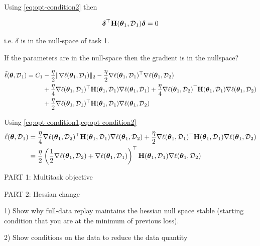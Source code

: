 \documentclass{article} %
\newcommand{\hessian}{\vH}
\begin{document}
Using \cref{eq:opt-condition2} then 

\begin{align}
    \vdelta^\top\hessian(\vparam_1, \data_{1})\vdelta = 0
\end{align}

i.e. $\delta$ is in the null-space of task 1. 

If the parameters are in the null-space then the gradient is in the nullspace?


\begin{align}
        \tilde{\loss}(\vparam, \data_{1}) 
        =  
        C_1 
        & -\frac{\eta}{2}\|\nabla\loss(\vparam_1,\data_1)\|_2 -\frac{\eta}{2}\nabla\loss(\vparam_1,\data_1)^\top\nabla\loss(\vparam_1,\data_2) \\
        &+ \frac{\eta}{4}\nabla\loss(\vparam_1,\data_1)^\top\hessian(\vparam_1, \data_{1})\nabla\loss(\vparam_1,\data_1) + \frac{\eta}{4}\nabla\loss(\vparam_1,\data_2)^\top\hessian(\vparam_1, \data_{1})\nabla\loss(\vparam_1,\data_2) \\
        &+ \frac{\eta}{2}\nabla\loss(\vparam_1,\data_1)^\top\hessian(\vparam_1, \data_{1})\nabla\loss(\vparam_1,\data_2)
\end{align}

Using \cref{eq:opt-condition1,eq:opt-condition2}
\begin{align}
        \tilde{\loss}(\vparam, \data_{1}) 
        & = \frac{\eta}{4}\nabla\loss(\vparam_1,\data_2)^\top\hessian(\vparam_1, \data_{1})\nabla\loss(\vparam_1,\data_2) + \frac{\eta}{2}\nabla\loss(\vparam_1,\data_1)^\top\hessian(\vparam_1, \data_{1})\nabla\loss(\vparam_1,\data_2) \\
        & = \frac{\eta}{2}\rnd{\frac{1}{2}\nabla\loss(\vparam_1,\data_2) + \nabla\loss(\vparam_1,\data_1)}^\top\hessian(\vparam_1, \data_{1})\nabla\loss(\vparam_1,\data_2)
\end{align}

PART 1: Multitask objective 



PART 2: Hessian change 



1) Show why full-data replay maintains the hessian null space stable (starting condition that you are at the minimum of previous loss).

2) Show conditions on the data to reduce the data quantity 
\end{document}

